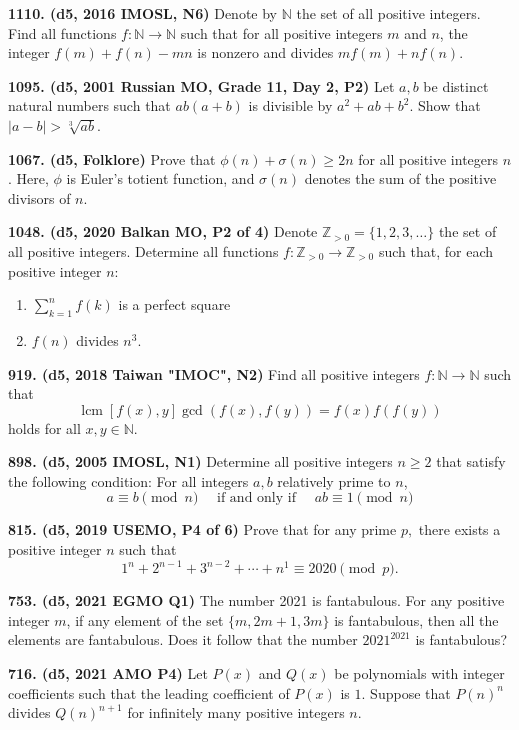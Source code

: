 \documentclass{article}
\begin{document}
\textbf{1110. (\color{red}d5\color{black}, 2016 IMOSL, N6)} Denote by $\mathbb{N}$ the set of all positive integers. Find all functions $f:\mathbb{N}\rightarrow \mathbb{N}$ such that for all positive integers $m$ and $n$, the integer $f(m)+f(n)-mn$ is nonzero and divides $mf(m)+nf(n)$.

\textbf{1095. (\color{red}d5\color{black}, 2001 Russian MO, Grade 11, Day 2, P2)} Let $a, b$ be distinct natural numbers such that $ab(a+b)$ is divisible by $a^2 + ab + b^2$. Show that $|a - b| > \sqrt[3]{ab}$.

\textbf{1067. (\color{red}d5\color{black}, Folklore)} Prove that $\phi(n)+\sigma(n) \geq 2n$ for all positive integers $n$.  Here, $\phi$ is Euler's totient function, and $\sigma(n)$ denotes the sum of the positive divisors of $n$.

\textbf{1048. (\color{red}d5\color{black}, 2020 Balkan MO, P2 of 4)} Denote $\mathbb{Z}_{>0}=\{1,2,3, \ldots\}$ the set of all positive integers. Determine all functions $f: \mathbb{Z}_{>0} \rightarrow \mathbb{Z}_{>0}$ such that, for each positive integer $n$:
\begin{enumerate} \item $\sum_{k=1}^{n} f(k)$ is a perfect square
    \item $f(n)$ divides $n^{3}$. \end{enumerate}

\textbf{919. (\color{red}d5\color{black}, 2018 Taiwan "IMOC", N2)} Find all positive integers $f: \mathbb{N} \to \mathbb{N}$ such that $$\operatorname{lcm}[f(x), y]\gcd(f(x), f(y))=f(x) f(f(y))$$ holds for all $x, y \in \mathbb{N}$.

\textbf{898. (\color{red}d5\color{black}, 2005 IMOSL, N1)} Determine all positive integers $n \geq 2$ that satisfy the following condition: For all integers $a, b$ relatively prime to $n$,
$$
    a \equiv b \pmod{n}\quad \text { if and only if } \quad a b \equiv 1\pmod{n}
$$

\textbf{815. (\color{red}d5\color{black}, 2019 USEMO, P4 of 6)} Prove that for any prime $p,$ there exists a positive integer $n$ such that \[1^n+2^{n-1}+3^{n-2}+\cdots+n^1\equiv 2020\pmod{p}.\]

\textbf{753. (\color{red}d5\color{black}, 2021 EGMO Q1)} The number 2021 is fantabulous. For any positive integer $m$, if any element of the set $\{m, 2m+1, 3m\}$ is fantabulous, then all the elements are fantabulous. Does it follow that the number $2021^{2021}$ is fantabulous?

\textbf{716. (\color{red}d5\color{black}, 2021 AMO P4)} Let $P(x)$ and $Q(x)$ be polynomials with integer coefficients such that the leading coefficient of $P(x) $ is $1$. Suppose that $P(n)^n$ divides $Q(n)^{n+1}$ for infinitely many positive integers $n$.
\end{document}
